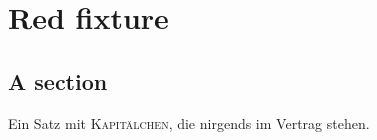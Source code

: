 \chapter{Red fixture}\label{c98}

\section{A section}\label{c98.s1}

Ein Satz mit \textsc{Kapitälchen}, die nirgends im Vertrag stehen.
